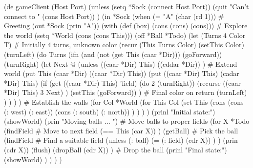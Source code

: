 \begin{wideverbatim}

(de gameClient (Host Port)
   (unless (setq *Sock (connect Host Port))
      (quit "Can't connect to " (cons Host Port)) )
   (in *Sock
      (when (= "A" (char (rd 1)))  # Greeting
         (out *Sock (prin "A"))
         (with (def (box) (cons (cons) (cons)))
            # Explore the world
            (setq *World (cons (cons This)))
            (off *Ball *Todo)
            (let (Turns 4  Color T)  # Initially 4 turns, unknown color
               (recur (This Turns Color)
                  (setThis Color)
                  (turnLeft)
                  (do Turns
                     (ifn (and (not (get This (caar *Dir))) (goForward))
                        (turnRight)
                        (let Next @
                           (unless ((caar *Dir) This)
                              ((cddar *Dir)) )  # Extend world
                           (put This (caar *Dir) ((caar *Dir) This))
                           (put ((caar *Dir) This) (cadar *Dir) This)
                           (if (get ((caar *Dir) This) 'field)
                              (do 2 (turnRight))
                              (recurse ((caar *Dir) This) 3 Next) )
                           (setThis (goForward)) )  # Final color on return
                        (turnLeft) ) ) ) )
            # Establish the walls
            (for Col *World
               (for This Col
                  (set This
                     (cons
                        (cons (: west) (: east))
                        (cons (: south) (: north)) ) ) ) )
            (prinl "Initial state:")
            (showWorld)
            (prin "Moving balls ... ")
            # Move balls to proper fields
            (for X *Todo
               (findField                    # Move to next field
                  (== This (car X)) )
               (getBall)                     # Pick the ball
               (findField                    # Find a suitable field
                  (unless (: ball)
                     (= (: field) (cdr X)) ) )
               (prin (cdr X))
               (flush)
               (dropBall (cdr X)) )          # Drop the ball
            (prinl "Final state:")
            (showWorld) ) ) ) )


\end{wideverbatim}

